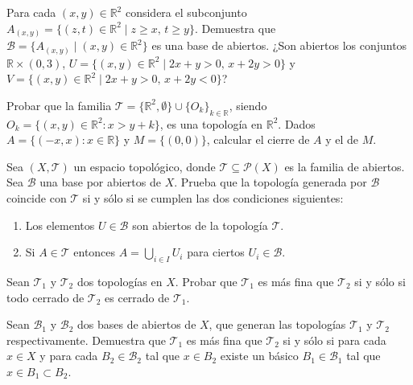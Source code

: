 \begin{ejer}[24]
Para cada $(x,y) \in \mathbb{R}^2$ considera el subconjunto $A_{(x,y)} = \{(z,t) \in \mathbb{R}^2 \mid z \ge x, \, t \ge y\}$. Demuestra que $\mathcal{B} = \{A_{(x,y)} \mid (x,y) \in \mathbb{R}^2\}$ es una base de abiertos. ¿Son abiertos los conjuntos $\mathbb{R} \times (0,3)$, $U = \{(x,y) \in \mathbb{R}^2 \mid 2x + y > 0, \, x + 2y > 0\}$ y $V = \{(x,y) \in \mathbb{R}^2 \mid 2x + y > 0, \, x + 2y < 0\}$?
\end{ejer}

\begin{ejer}[25]
Probar que la familia $\mathcal{T} = \{\mathbb{R}^2, \emptyset\} \cup \{O_k\}_{k \in \mathbb{R}}$, siendo $O_k = \{(x,y) \in \mathbb{R}^2 : x > y + k\}$, es una topología en $\mathbb{R}^2$. Dados $A = \{(-x, x) : x \in \mathbb{R}\}$ y $M = \{(0,0)\}$, calcular el cierre de $A$ y el de $M$.
\end{ejer}

\begin{ejer}[26]
Sea $(X, \mathcal{T})$ un espacio topológico, donde $\mathcal{T} \subseteq \mathcal{P}(X)$ es la familia de abiertos. Sea $\mathcal{B}$ una base por abiertos de $X$. Prueba que la topología generada por $\mathcal{B}$ coincide con $\mathcal{T}$ si y sólo si se cumplen las dos condiciones siguientes:
\begin{enumerate}
    \item[a)] Los elementos $U \in \mathcal{B}$ son abiertos de la topología $\mathcal{T}$.
    \item[b)] Si $A \in \mathcal{T}$ entonces $A = \bigcup_{i \in I} U_i$ para ciertos $U_i \in \mathcal{B}$.
\end{enumerate}
\end{ejer}

\begin{ejer}[27]
Sean $\mathcal{T}_1$ y $\mathcal{T}_2$ dos topologías en $X$. Probar que $\mathcal{T}_1$ es más fina que $\mathcal{T}_2$ si y sólo si todo cerrado de $\mathcal{T}_2$ es cerrado de $\mathcal{T}_1$.
\end{ejer}

\begin{ejer}[28]
Sean $\mathcal{B}_1$ y $\mathcal{B}_2$ dos bases de abiertos de $X$, que generan las topologías $\mathcal{T}_1$ y $\mathcal{T}_2$ respectivamente. Demuestra que $\mathcal{T}_1$ es más fina que $\mathcal{T}_2$ si y sólo si para cada $x \in X$ y para cada $B_2 \in \mathcal{B}_2$ tal que $x \in B_2$ existe un básico $B_1 \in \mathcal{B}_1$ tal que $x \in B_1 \subset B_2$.
\end{ejer}

